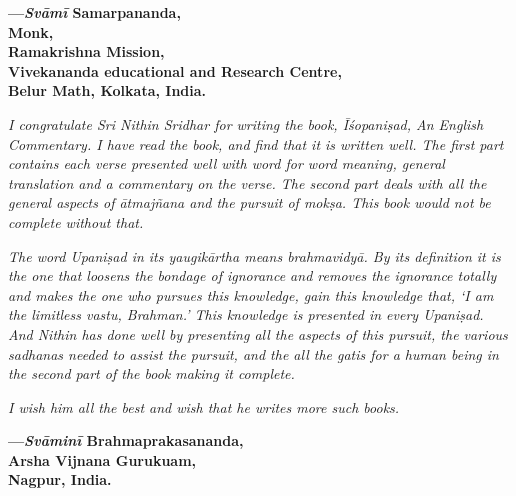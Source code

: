 \begin{flushright}
\textbf{---\emph{Svāmī} Samarpananda,}\\
\textbf{Monk,}\\
\textbf{Ramakrishna Mission,}\\
\textbf{Vivekananda educational and Research Centre,}\\
\textbf{Belur Math, Kolkata, India.}
\end{flushright}
\medskip

\emph{I congratulate Sri Nithin Sridhar for writing the book, Īśopaniṣad, An English Commentary. I have read the book, and find that it is written well. The first part contains each verse presented well with word for word meaning, general translation and a commentary on the verse. The second part deals with all the general aspects of ātmajñana and the pursuit of mokṣa. This book would not be complete without that. }

\emph{The word Upaniṣad in its yaugikārtha means brahmavidyā. By its definition it is the one that loosens the bondage of ignorance and removes the ignorance totally and makes the one who pursues this knowledge, gain this knowledge that, `I am the limitless vastu, Brahman.' This knowledge is presented in every Upaniṣad. And Nithin has done well by presenting all the aspects of this pursuit, the various sadhanas needed to assist the pursuit, and the all the gatis for a human being in the second part of the book making it complete. }

\emph{I wish him all the best and wish that he writes more such books.}
\medskip

\begin{flushright}
\textbf{---\emph{Svāminī} Brahmaprakasananda,}\\
\textbf{Arsha Vijnana Gurukuam,}\\
\textbf{Nagpur, India. }
\end{flushright}

